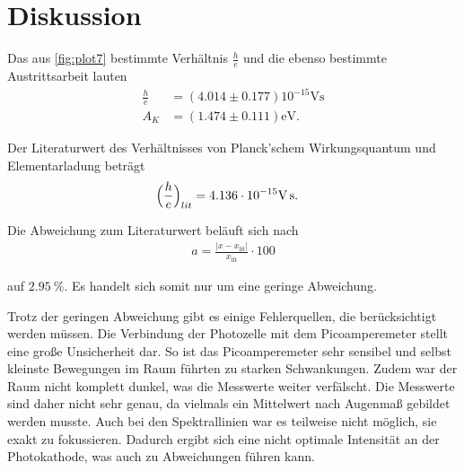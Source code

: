 \section{Diskussion}
\label{sec:Diskussion}

Das aus \autoref{fig:plot7} bestimmte Verhältnis $\frac{h}{e}$ und die ebenso bestimmte Austrittsarbeit lauten
\begin{align*}
    \frac{h}{e} &= (4.014 \pm 0.177) 10^{-15} \si{\volt\second} \\
    A_K &=  (1.474 \pm 0.111) \si{\electronvolt}.
\end{align*}

Der Literaturwert des Verhältnisses von Planck'schem Wirkungsquantum\cite{Planck} und Elementarladung\cite{Elementarladung} beträgt
\begin{align*}
    \Bigl(\frac{h}{e}\Bigr)_{lit} &= 4.136 \cdot 10^{-15} \si{\volt\second}.
\end{align*}

Die Abweichung zum Literaturwert beläuft sich nach
\begin{align*}
    a=\frac{|x-x_{\text{lit}}|}{x_{\text{lit}}}\cdot 100 \label{eqn:abweich}
\end{align*}

auf $\qty{2.95}{\percent}$. Es handelt sich somit nur um eine geringe Abweichung.

Trotz der geringen Abweichung gibt es einige Fehlerquellen, die berücksichtigt werden müssen.
Die Verbindung der Photozelle mit dem Picoamperemeter stellt eine große Unsicherheit dar.
So ist das Picoamperemeter sehr sensibel und selbst kleinste Bewegungen im Raum führten zu starken Schwankungen.
Zudem war der Raum nicht komplett dunkel, was die Messwerte weiter verfälscht.
Die Messwerte sind daher nicht sehr genau, da vielmals ein Mittelwert nach Augenmaß gebildet werden musste.
Auch bei den Spektrallinien war es teilweise nicht möglich, sie exakt zu fokussieren. Dadurch ergibt sich eine nicht optimale Intensität
an der Photokathode, was auch zu Abweichungen führen kann.